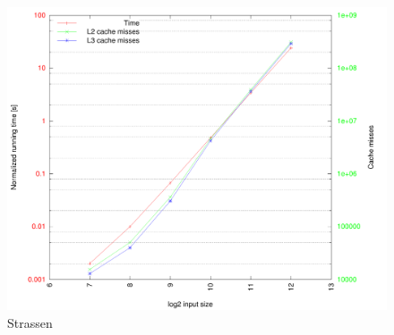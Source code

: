 \begin{figure}[h!]
  \centering
  \includegraphics[width=\textwidth]{"../project2/plots/4096/z-curve-tiled strassen-32(32-fixed-tiled-bc)_z-curve-tiled strassen-32(32-fixed-tiled-bc)_z-curve-tiled strassen-32(32-fixed-tiled-bc)_0"}
  \caption{Strassen}
\end{figure}